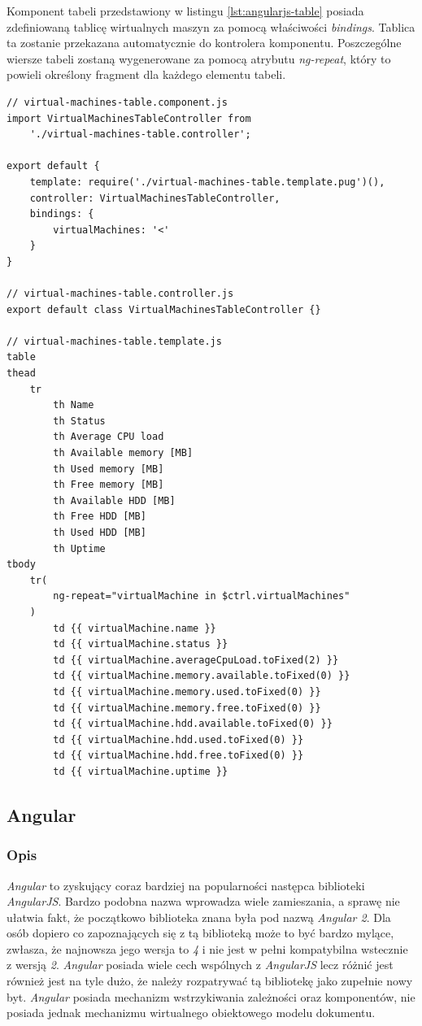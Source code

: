 \documentclass[polish, twoside, 12pt]{mwart}
\begin{document}
Komponent tabeli przedstawiony w listingu \ref{lst:angularjs-table} posiada zdefiniowaną tablicę wirtualnych maszyn za pomocą właściwości \emph{bindings}. Tablica ta zostanie przekazana automatycznie do kontrolera komponentu. Poszczególne wiersze tabeli zostaną wygenerowane za pomocą atrybutu \emph{ng-repeat}, który to powieli określony fragment dla każdego elementu tabeli.

\begin{lstlisting}[caption=Komponent tabeli, label={lst:angularjs-table}]
// virtual-machines-table.component.js
import VirtualMachinesTableController from
    './virtual-machines-table.controller';

export default {
    template: require('./virtual-machines-table.template.pug')(),
    controller: VirtualMachinesTableController,
    bindings: {
        virtualMachines: '<'
    }
}

// virtual-machines-table.controller.js
export default class VirtualMachinesTableController {}

// virtual-machines-table.template.js
table
thead
    tr
        th Name
        th Status
        th Average CPU load
        th Available memory [MB]
        th Used memory [MB]
        th Free memory [MB]
        th Available HDD [MB]
        th Free HDD [MB]
        th Used HDD [MB]
        th Uptime
tbody
    tr(
        ng-repeat="virtualMachine in $ctrl.virtualMachines"
    )
        td {{ virtualMachine.name }}
        td {{ virtualMachine.status }}
        td {{ virtualMachine.averageCpuLoad.toFixed(2) }}
        td {{ virtualMachine.memory.available.toFixed(0) }}
        td {{ virtualMachine.memory.used.toFixed(0) }}
        td {{ virtualMachine.memory.free.toFixed(0) }}
        td {{ virtualMachine.hdd.available.toFixed(0) }}
        td {{ virtualMachine.hdd.used.toFixed(0) }}
        td {{ virtualMachine.hdd.free.toFixed(0) }}
        td {{ virtualMachine.uptime }}
\end{lstlisting}

\subsection{Angular}

\subsubsection{Opis}

\emph{Angular} \cite{angular} to zyskujący coraz bardziej na popularności następca biblioteki \emph{AngularJS}. Bardzo podobna nazwa wprowadza wiele zamieszania, a sprawę nie ułatwia fakt, że początkowo biblioteka znana była pod nazwą \emph{Angular 2}. Dla osób dopiero co zapoznających się z tą biblioteką może to być bardzo mylące, zwłasza, że najnowsza jego wersja to \emph{4} i nie jest w pełni kompatybilna wstecznie z wersją \emph{2}. \emph{Angular} posiada wiele cech wspólnych z \emph{AngularJS} lecz różnić jest również jest na tyle dużo, że należy rozpatrywać tą bibliotekę jako zupełnie nowy byt. \emph{Angular} posiada mechanizm wstrzykiwania zależności oraz komponentów, nie posiada jednak mechanizmu wirtualnego obiektowego modelu dokumentu.
\end{document}
